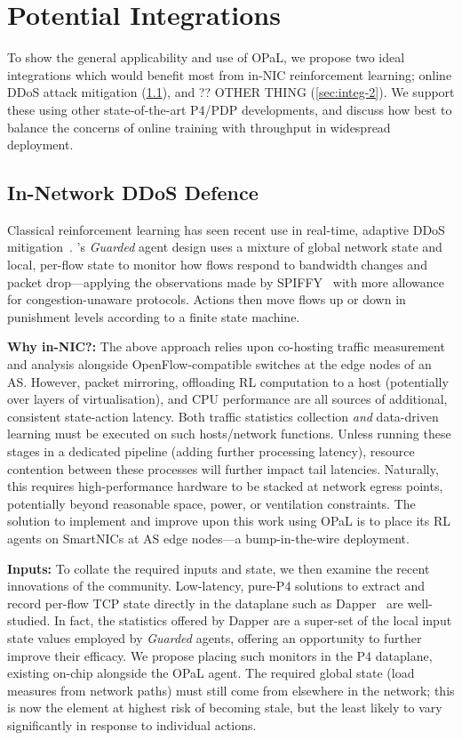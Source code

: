 \documentclass[sigconf,natbib=false]{acmart}
\newcommand{\fakepara}[1]{\noindent\textbf{#1:}}
\newcommand{\approachshort}{OPaL}
\begin{document}
\section{Potential Integrations}\label{sec:potential-integrations}
To show the general applicability and use of \approachshort{}, we propose two ideal integrations which would benefit most from in-NIC reinforcement learning; online DDoS attack mitigation (\cref{sec:integ-1}), and ?? OTHER THING (\cref{sec:integ-2}).
We support these using other state-of-the-art P4/PDP developments, and discuss how best to balance the concerns of online training with throughput in widespread deployment.

\subsection{In-Network DDoS Defence}\label{sec:integ-1}
Classical reinforcement learning has seen recent use in real-time, adaptive DDoS mitigation~\parencite{DBLP:journals/tnsm/SimpsonRP20}.
's \emph{Guarded} agent design uses a mixture of global network state and local, per-flow state to monitor how flows respond to bandwidth changes and packet drop---applying the observations made by SPIFFY~\parencite{DBLP:conf/ndss/KangGS16} with more allowance for congestion-unaware protocols.
Actions then move flows up or down in punishment levels according to a finite state machine.

\fakepara{Why in-NIC?}
The above approach relies upon co-hosting traffic measurement and analysis alongside OpenFlow-compatible switches at the edge nodes of an AS.
However, packet mirroring, offloading RL computation to a host (potentially over layers of virtualisation), and CPU performance are all sources of additional, consistent state-action latency.
Both traffic statistics collection \emph{and} data-driven learning must be executed on such hosts/network functions.
Unless running these stages in a dedicated pipeline (adding further processing latency), resource contention between these processes will further impact tail latencies.
Naturally, this requires high-performance hardware to be stacked at network egress points, potentially beyond reasonable space, power, or ventilation constraints.
The solution to implement and improve upon this work using \approachshort{} is to place its RL agents on SmartNICs at AS edge nodes---a bump-in-the-wire deployment.

\fakepara{Inputs}
To collate the required inputs and state, we then examine the recent innovations of the community.
Low-latency, pure-P4 solutions to extract and record per-flow TCP state directly in the dataplane such as Dapper~\parencite{DBLP:conf/sosr/GhasemiBR17} are well-studied.
In fact, the statistics offered by Dapper are a super-set of the local input state values employed by \emph{Guarded} agents, offering an opportunity to further improve their efficacy. 
We propose placing such monitors in the P4 dataplane, existing on-chip alongside the \approachshort{} agent.
The required global state (load measures from network paths) must still come from elsewhere in the network; this is now the element at highest risk of becoming stale, but the least likely to vary significantly in response to individual actions.
\end{document}
